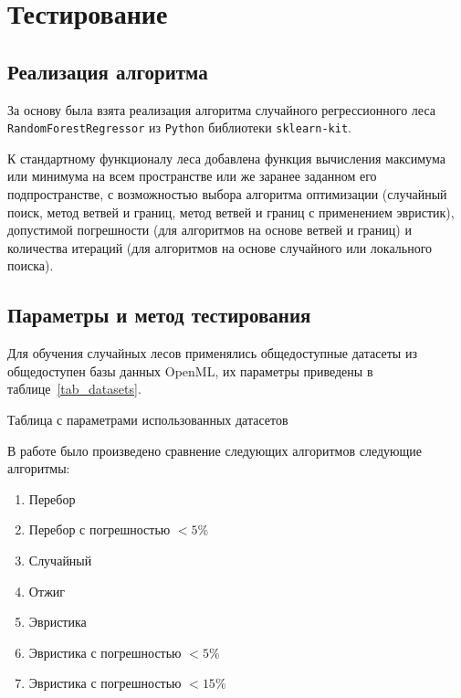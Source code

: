 \chapter{Тестирование}

\section{Реализация алгоритма}

За основу была взята реализация алгоритма случайного регрессионного леса
\texttt{RandomForestRegressor} из \texttt{Python} библиотеки
\texttt{sklearn-kit}. 

К стандартному функционалу леса добавлена функция вычисления максимума или
минимума на всем пространстве или же заранее заданном его подпространстве,
с возможностью выбора алгоритма оптимизации (случайный поиск, метод ветвей
и границ, метод ветвей и границ с применением эвристик), допустимой погрешности
(для алгоритмов на основе ветвей и границ) и количества итераций (для алгоритмов
на основе случайного или локального поиска). 

\section{Параметры и метод тестирования}

Для обучения случайных лесов применялись общедоступные датасеты из общедоступен
базы данных OpenML, их параметры приведены в таблице~\ref{tab_datasets}.

\begin{center}
    \begin{table}[!ht]
    \caption{Таблица с параметрами использованных датасетов}\label{tab_datasets}
        
    \end{table}
\end{center}

В работе было произведено сравнение следующих алгоритмов следующие алгоритмы: 

\begin{enumerate}
        \item Перебор
        \item Перебор с погрешностью $<5\%$
        \item Случайный
        \item Отжиг
        \item Эвристика
        \item Эвристика с погрешностью $<5\%$
        \item Эвристика с погрешностью $<15\%$
\end{enumerate}

